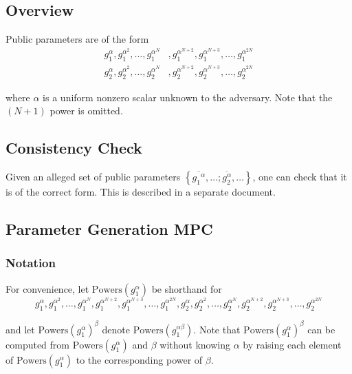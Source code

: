 \documentclass{article}
\newcommand{\gOne}[1]{g_1^{\alpha^{#1}}}
\newcommand{\gTwo}[1]{g_2^{\alpha^{#1}}}
\newcommand{\?}{\stackrel{?}{=}}
\begin{document}
\subsection*{Overview}

Public parameters are of the form
\begin{align*}
g_1^\alpha, \gOne{2}, \dots, \gOne{N}&,  \gOne{N+2}, \gOne{N+3}, \dots, \gOne{2N} \\
g_2^{\alpha}, \gTwo{2}, \dots, \gTwo{N}&,  \gTwo{N+2}, \gTwo{N+3}, \dots, \gTwo{2N}
\end{align*}

where $\alpha$ is a uniform nonzero scalar unknown to the adversary. Note that the $(N+1)$ power is omitted.



\subsection*{Consistency Check}
\newcommand{\hOne}[1]{\overline{\gOne{#1}}}
\newcommand{\hTwo}[1]{\overline{\gTwo{#1}}}

Given an alleged set of public parameters $
\left\{ \overline{g_1{^\alpha}}, \dots; \overline{g_2^{\alpha}}, \dots \right \}
$, one can check that it is of the correct form. This is described in a separate document.

\subsection*{Parameter Generation MPC}

\subsubsection*{Notation}
\newcommand{\powers}{\mathrm{Powers}}
For convenience, let $\powers(g_1^\alpha)$ be shorthand for
\[
g_1^\alpha, \gOne{2}, \dots, \gOne{N},  \gOne{N+2}, \gOne{N+3}, \dots, \gOne{2N}, g_2^{\alpha}, \gTwo{2}, \dots, \gTwo{N}, \gTwo{N+2}, \gTwo{N+3}, \dots, \gTwo{2N}
\]

and let $\powers(g_1^\alpha)^\beta$ denote $\powers(g_1^{\alpha\beta})$.
Note that $\powers(g_1^\alpha)^\beta$ can be computed from $\powers(g_1^\alpha)$ and $\beta$ without knowing $\alpha$ by raising each element of $\powers(g_1^\alpha)$ to the corresponding power of $\beta$. 

\end{document}

